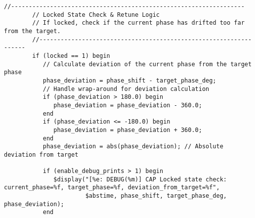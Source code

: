 \begin{lstlisting}[caption={Verilog-A Generic Capacitor Tuner Implementation}]
        //------------------------------------------------------------------
        // Locked State Check & Retune Logic
        // If locked, check if the current phase has drifted too far from the target.
        //------------------------------------------------------------------
        if (locked == 1) begin
           // Calculate deviation of the current phase from the target phase
           phase_deviation = phase_shift - target_phase_deg;
           // Handle wrap-around for deviation calculation
           if (phase_deviation > 180.0) begin
              phase_deviation = phase_deviation - 360.0;
           end
           if (phase_deviation <= -180.0) begin
              phase_deviation = phase_deviation + 360.0;
           end
           phase_deviation = abs(phase_deviation); // Absolute deviation from target

           if (enable_debug_prints > 1) begin
              $display("[%e: DEBUG(%m)] CAP Locked state check: current_phase=%f, target_phase=%f, deviation_from_target=%f",
                       $abstime, phase_shift, target_phase_deg, phase_deviation);
           end


\end{lstlisting}
